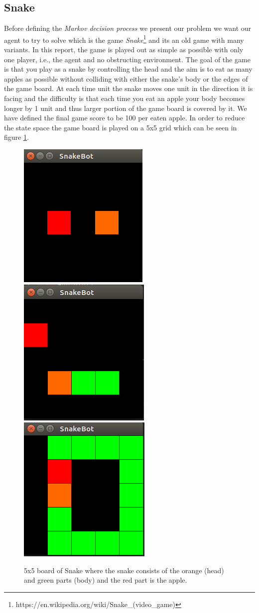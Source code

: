 \documentclass[result.tex]{subfiles}
\begin{document}
    \subsection*{Snake}

    Before defining the \textit{Markov decision process} we present our problem we want our agent to try to solve which is the game \textit{Snake}\footnote{https://en.wikipedia.org/wiki/Snake\_(video\_game)} and its an old game with many variants. In this report, the game is played out as simple as possible with only one player, i.e., the agent and no obstructing environment. The goal of the game is that you play as a snake by controlling the head and the aim is to eat as many apples as possible without colliding with either the snake's body or the edges of the game board. At each time unit the snake moves one unit in the direction it is facing and the difficulty is that each time you eat an apple your body becomes longer by 1 unit and thus larger portion of the game board is covered by it. We have defined the final game score to be 100 per eaten apple.  In order to reduce the state space the game board is played on a 5x5 grid which can be seen in figure \ref{fig:snake}.

    \begin{figure}[H]
        \centering
        \includegraphics[width=.3\textwidth]{./images/snake1}\hfill
        \includegraphics[width=.3\textwidth]{./images/snake2}\hfill
        \includegraphics[width=.3\textwidth]{./images/snake3}
        \caption{5x5 board of Snake where the snake consists of the orange (head) and green parts (body) and the red part is the apple.}
        \label{fig:snake}
    \end{figure}
\end{document}
